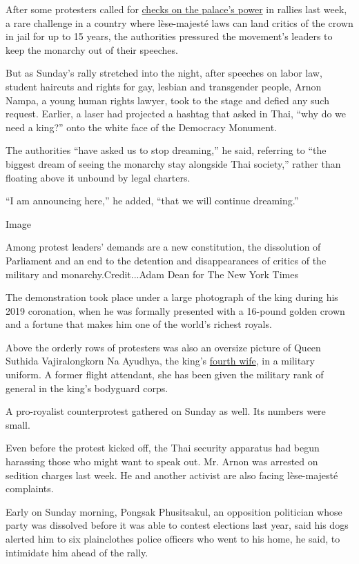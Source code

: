 After some protesters called for
\href{https://www.nytimes3xbfgragh.onion/2020/08/13/world/asia/protests-thailand-king-monarchy.html}{checks
on the palace's power} in rallies last week, a rare challenge in a
country where lèse-majesté laws can land critics of the crown in jail
for up to 15 years, the authorities pressured the movement's leaders to
keep the monarchy out of their speeches.

But as Sunday's rally stretched into the night, after speeches on labor
law, student haircuts and rights for gay, lesbian and transgender
people, Arnon Nampa, a young human rights lawyer, took to the stage and
defied any such request. Earlier, a laser had projected a hashtag that
asked in Thai, ``why do we need a king?'' onto the white face of the
Democracy Monument.

The authorities ``have asked us to stop dreaming,'' he said, referring
to ``the biggest dream of seeing the monarchy stay alongside Thai
society,'' rather than floating above it unbound by legal charters.

``I am announcing here,'' he added, ``that we will continue dreaming.''

Image

Among protest leaders' demands are a new constitution, the dissolution
of Parliament and an end to the detention and disappearances of critics
of the military and monarchy.Credit...Adam Dean for The New York Times

The demonstration took place under a large photograph of the king during
his 2019 coronation, when he was formally presented with a 16-pound
golden crown and a fortune that makes him one of the world's richest
royals.

Above the orderly rows of protesters was also an oversize picture of
Queen Suthida Vajiralongkorn Na Ayudhya, the king's
\href{https://www.nytimes3xbfgragh.onion/2019/11/06/world/asia/thailand-king-consort-wives.html}{fourth
wife}, in a military uniform. A former flight attendant, she has been
given the military rank of general in the king's bodyguard corps.

A pro-royalist counterprotest gathered on Sunday as well. Its numbers
were small.

Even before the protest kicked off, the Thai security apparatus had
begun harassing those who might want to speak out. Mr. Arnon was
arrested on sedition charges last week. He and another activist are also
facing lèse-majesté complaints.

Early on Sunday morning, Pongsak Phusitsakul, an opposition politician
whose party was dissolved before it was able to contest elections last
year, said his dogs alerted him to six plainclothes police officers who
went to his home, he said, to intimidate him ahead of the rally.

